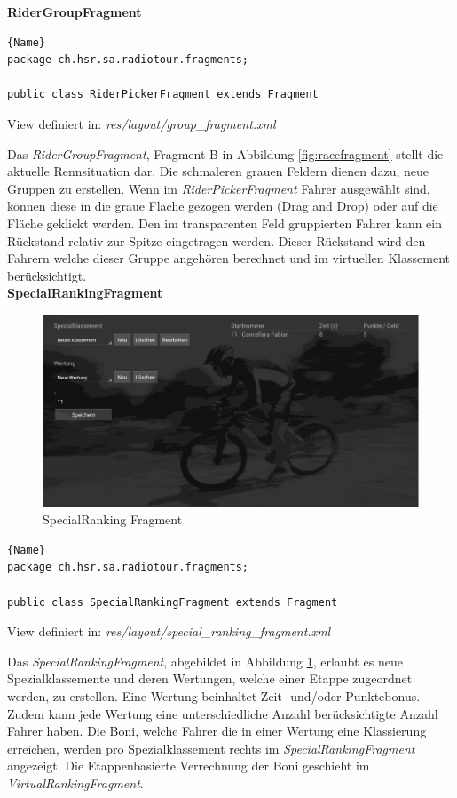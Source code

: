 \textbf{RiderGroupFragment}
\begin{lstlisting}{Name}
package ch.hsr.sa.radiotour.fragments;

public class RiderPickerFragment extends Fragment
\end{lstlisting}


View definiert in:
\textit{res/layout/group\_fragment.xml}

Das \textit{RiderGroupFragment}, Fragment B in Abbildung \ref{fig:racefragment} stellt die aktuelle Rennsituation dar. Die schmaleren grauen Feldern dienen dazu, neue Gruppen zu erstellen. Wenn im \textit{RiderPickerFragment} Fahrer ausgewählt sind, können diese in die graue Fläche gezogen werden (Drag and Drop) oder auf die Fläche geklickt werden.
Den im transparenten Feld gruppierten Fahrer kann ein Rückstand relativ zur Spitze eingetragen werden. Dieser Rückstand wird den Fahrern welche dieser Gruppe angehören berechnet und im virtuellen Klassement berücksichtigt.
\\

\textbf{SpecialRankingFragment}
\begin{figure}[h!]
\caption{SpecialRanking Fragment}
\label{fig:specialrankingfragment}
\centering
\includegraphics[scale=0.8]{07anhang/images/dev_specialranking.png}
\end{figure}


\begin{lstlisting}{Name}
package ch.hsr.sa.radiotour.fragments;

public class SpecialRankingFragment extends Fragment
\end{lstlisting}

View definiert in:
\textit{res/layout/special\_ranking\_fragment.xml}

Das \textit{SpecialRankingFragment}, abgebildet in Abbildung \ref{fig:specialrankingfragment}, erlaubt es neue Spezialklassemente und deren Wertungen, welche einer Etappe zugeordnet werden, zu erstellen. Eine Wertung beinhaltet Zeit- und/oder Punktebonus. Zudem kann jede Wertung eine unterschiedliche Anzahl berücksichtigte Anzahl Fahrer haben. Die Boni, welche Fahrer die in einer Wertung eine Klassierung erreichen, werden pro Spezialklassement rechts im \textit{SpecialRankingFragment} angezeigt. Die Etappenbasierte Verrechnung der Boni geschieht im \textit{VirtualRankingFragment}.


